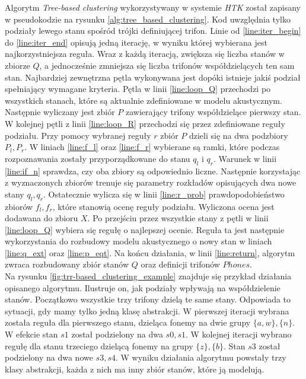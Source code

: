 \documentclass[shortabstract, mgr]{iithesis}
\begin{document}
	Algorytm \textit{Tree-based clustering} wykorzystywany w systemie \textit{HTK} został zapisany w pseudokodzie na rysunku \ref{alg:tree_based_clustering}. Kod uwzględnia tylko podziały lewego stanu spośród trójki definiującej trifon. Linie od \ref{line:iter_begin} do \ref{line:iter_end} opisują jedną iterację, w wyniku której wybierana jest najkorzystniejsza reguła. Wraz z każdą iteracją, zwiększa się liczba stanów w zbiorze $Q$, a jednocześnie zmniejsza się liczba trifonów współdzielących ten sam stan. Najbardziej zewnętrzna pętla wykonywana jest dopóki istnieje jakiś  podział spełniający wymagane kryteria. Pętla w linii \ref{line:loop_Q} przechodzi po wszystkich stanach, które są aktualnie zdefiniowane w modelu akustycznym. Następnie wyliczany jest zbiór $P$ zawierający trifony współdzielące pierwszy stan. W kolejnej pętli z linii \ref{line:loop_R} przechodzi się przez zdefiniowane reguły podziału. Przy pomocy wybranej reguły $r$ zbiór $P$ dzieli się na dwa podzbiory $P_l, P_r$. W liniach \ref{line:f_l} oraz \ref{line:f_r} wybierane są ramki, które podczas rozpoznawania zostały przyporządkowane do stanu $q_l$ i $q_r$. Warunek w linii \ref{line:if_n} sprawdza, czy oba zbiory są odpowiednio liczne. Następnie korzystając z wyznaczonych zbiorów trenuje się parametry rozkładów opisujących dwa nowe stany $q_l, q_r$. Ostatecznie wylicza się w linii \ref{line:r_prob} prawdopodobieństwo zbiorów $f_l, f_r$, które stanowią ocenę reguły podziału. Wyliczona ocena jest dodawana do zbioru $X$. Po przejściu przez wszystkie stany z pętli w linii \ref{line:loop_Q} wybiera się regułę o najlepszej ocenie. Reguła ta jest następnie wykorzystania do rozbudowy modelu akustycznego o nowy stan w liniach \ref{line:q_ext} oraz \ref{line:p_eqt}. Na końcu działania, w linii \ref{line:return}, algorytm zwraca rozbudowany zbiór stanów $Q$ oraz definicji trifonów $Phones$.\\
	Na rysunku \ref{fig:trr-based_clustering_example} znajduje się przykład działania opisanego algorytmu. Ilustruje on, jak podziały wpływają na współdzielenie stanów. Początkowo wszystkie trzy trifony dzielą te same stany. Odpowiada to sytuacji, gdy mamy tylko jedną klasę abstrakcji. W pierwszej iteracji wybrana została reguła dla pierwszego stanu, dzieląca fonemy na dwie grupy $\{a,w\},\{n\}$. W efekcie stan $s1$ został podzielony na dwa $s0,s1$. W kolejnej iteracji wybrano regułę dla stanu trzeciego dzielącą fonemy na grupy $\{z\},\{b\}$. Stan $s3$ został podzielony na dwa nowe $s3,s4$. W wyniku działania algorytmu powstały trzy klasy abstrakcji, każda z nich ma inny zbiór stanów, które ją modelują. \\
\end{document}

